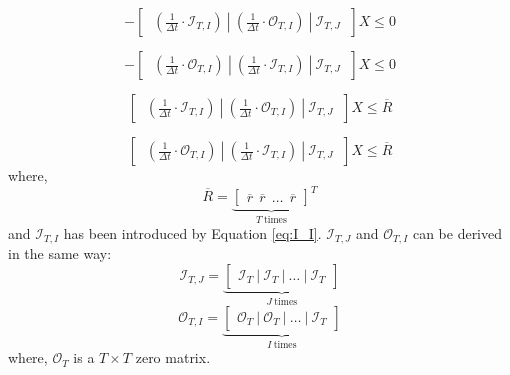 \begin{equation}
- \begin{bmatrix}
~\left(\frac{1}{\Delta t} \cdot \mathcal{I}_{T,I}\right) ~|~ \left(\frac{1}{\Delta t} \cdot \mathcal{O}_{T,I}\right)~|~ \mathcal{I}_{T,J}~
\end{bmatrix} X \leq 0
\end{equation}

\begin{equation}
-\begin{bmatrix}
~\left(\frac{1}{\Delta t} \cdot \mathcal{O}_{T,I}\right) ~|~ \left(\frac{1}{\Delta t} \cdot \mathcal{I}_{T,I}\right)~|~\mathcal{I}_{T,J}~
\end{bmatrix} X \leq 0
\end{equation}

\begin{equation}
\label{constraint:ESS-capacity}
\begin{bmatrix}
~\left(\frac{1}{\Delta t} \cdot \mathcal{I}_{T,I}\right) ~|~ \left(\frac{1}{\Delta t} \cdot \mathcal{O}_{T,I}\right)~|~ \mathcal{I}_{T,J}~
\end{bmatrix}X \leq \overline{R}
\end{equation}

\begin{equation}
\label{constraint:ESS-capacity-2}
\begin{bmatrix}
~\left(\frac{1}{\Delta t} \cdot \mathcal{O}_{T,I}\right) ~|~ \left(\frac{1}{\Delta t} \cdot \mathcal{I}_{T,I}\right)~|~\mathcal{I}_{T,J}~
\end{bmatrix}X \leq \overline{R}
\end{equation}
where, 
\begin{equation*}
\overline{R} = {\underbrace{\begin{bmatrix}
		\overline{r}~~\overline{r}~~ \dots~~\overline{r}
		\end{bmatrix}}_{T~\text{times}}}^T
\end{equation*}
and $\mathcal{I}_{T,I}$ has been introduced by Equation \eqref{eq:I_I}. $\mathcal{I}_{T,J}$ and $\mathcal{O}_{T,I}$ can be derived in the same way:
\begin{equation*}
\mathcal{I}_{T,J} = {\underbrace{\begin{bmatrix}
		\mathcal{I}_T ~|~\mathcal{I}_T ~|~ \dots~|~\mathcal{I}_T 
		\end{bmatrix}}_{J~\text{times}}}
\end{equation*}
\begin{equation*}
\mathcal{O}_{T,I} = {\underbrace{\begin{bmatrix}
		\mathcal{O}_T ~|~\mathcal{O}_T ~|~ \dots~|~\mathcal{I}_T 
		\end{bmatrix}}_{I~\text{times}}}
\end{equation*}
where, $\mathcal{O}_T$ is a $T \times T$ zero matrix.

